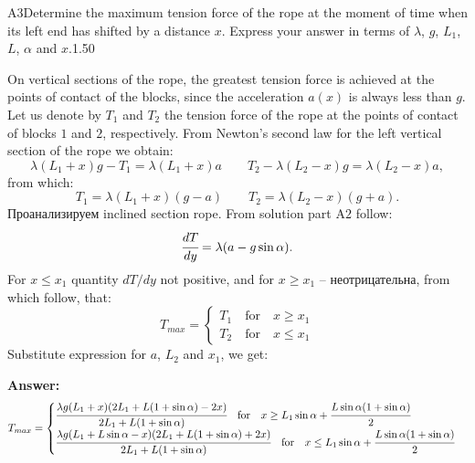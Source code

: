 \documentclass[11pt,a4paper]{article}
\begin{document}
\begin{solcard}{A3}{Determine the maximum tension force of the rope at the moment of time when its left end has shifted by a distance $x$. Express your answer in terms of $\lambda$, $g$, $L_1$, $L$, $\alpha$ and $x$.}{1.50}

On vertical sections of the rope, the greatest tension force is achieved at the points of contact of the blocks, since the acceleration $a(x)$ is always less than $g$. Let us denote by $T_1$ and $T_2$ the tension force of the rope at the points of contact of blocks $1$ and $2$, respectively. From Newton's second law for the left vertical section of the rope we obtain: $$\lambda(L_1+x)g-T_1=\lambda(L_1+x)a\qquad T_2-\lambda(L_2-x)g=\lambda(L_2-x)a{,} $$from which: $$T_1=\lambda(L_1+x)(g-a)\qquad T_2=\lambda(L_2-x)(g+a){.} $$Проанализируем inclined section rope. From solution part $\mathrm{A2}$ follow: $$\cfrac{dT}{dy}=\lambda(a-g\sin\alpha) {.} $$For $x\leq x_1$ quantity $dT/dy$ not positive, and for $x\geq x_1$ – неотрицательна, from which follow, that: $$T_{max}=\begin{cases} T_1\quad\text{for}\quad x\geq x_1\\ T_2\quad\text{for}\quad x\leq x_1 \end{cases} $$Substitute expression for $a$, $L_2$ and $x_1$, we get:

\par\smallskip\noindent\textbf{Answer:} $$T_{max}=\begin{cases} \cfrac{\lambda g(L_1+x)(2L_1+L(1+\sin\alpha)-2x)}{2L_1+L(1+\sin\alpha)}\quad \text{for}\quad x\geq L_1\sin\alpha+\cfrac{L\sin\alpha(1+\sin\alpha)}{2}\\ \cfrac{\lambda g(L_1+L\sin\alpha-x)(2L_1+L(1+\sin\alpha)+2x)}{2L_1+L(1+\sin\alpha)}\quad \text{for}\quad x\leq L_1\sin\alpha+\cfrac{L\sin\alpha(1+\sin\alpha)}{2} \end{cases} $$
\end{solcard}
\end{document}
